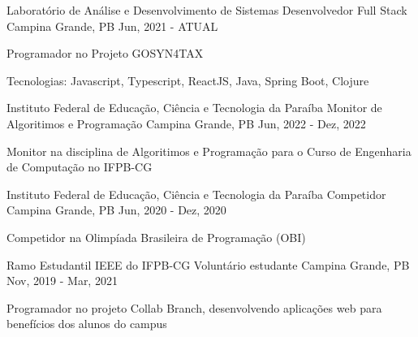 
\begin{cventries}
  \cventry
    {Laboratório de Análise e Desenvolvimento de Sistemas}
    {Desenvolvedor Full Stack}
    {Campina Grande, PB}
    {Jun, 2021 - ATUAL}
    {
      \begin{cvitems}
        \item {Programador no Projeto GOSYN4TAX}
        \item {Tecnologias: Javascript, Typescript, ReactJS, Java, Spring Boot, Clojure}
      \end{cvitems}
    }

  \cventry
    {Instituto Federal de Educação, Ciência e Tecnologia da Paraíba}
    {Monitor de Algoritimos e Programação}
    {Campina Grande, PB}
    {Jun, 2022 - Dez, 2022}
    {
      \begin{cvitems}
        \item {Monitor na disciplina de Algoritimos e Programação para o Curso de Engenharia de Computação no IFPB-CG}
      \end{cvitems}
    }

  \cventry
    {Instituto Federal de Educação, Ciência e Tecnologia da Paraíba}
    {Competidor}
    {Campina Grande, PB}
    {Jun, 2020 - Dez, 2020}
    {
      \begin{cvitems}
        \item {Competidor na Olimpíada Brasileira de Programação (OBI)}
      \end{cvitems}
    }

  \cventry
    {Ramo Estudantil IEEE do IFPB-CG}
    {Voluntário estudante}
    {Campina Grande, PB}
    {Nov, 2019 - Mar, 2021}
    {
      \begin{cvitems}
        \item {Programador no projeto Collab Branch, desenvolvendo aplicações web para benefícios dos alunos do campus}
      \end{cvitems}
    }
    
\end{cventries}
